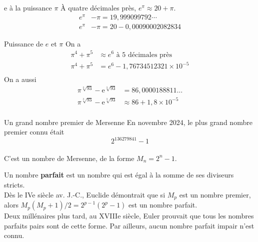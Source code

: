 \documentclass[aspectratio=1610,10pt,dvipsnames]{beamer}
\begin{document}
\begin{frame}{e à la puissance $\pi$}
À quatre décimales près, $e^\pi \approx 20 + \pi$.
\\[2cm]
\begin{equation*}
\begin{split}
    e^{\pi} &- \pi = 19,999099792\cdots \\
    e^{\pi} &- \pi = 20 - 0,00090002082834
\end{split}
\end{equation*}

\end{frame}

\begin{frame}{Puissance de $e$ et $\pi$}
On a 
\begin{equation*}
\begin{split}
    \pi^4 + \pi^5 &\approx e^6 \textrm{ à 5 décimales près} \\
    \pi^4 + \pi^5 &= e^6 - 1,76734512321 \times 10^{-5} \\
\end{split}
\end{equation*}
On a aussi
\begin{equation*}
\begin{split}
    \pi ^{\sqrt[{3}]{93}}-\mathrm {e} ^{\sqrt[{3}]{93}} &= 86{,}0000188811\dots \\
     \pi ^{\sqrt[{3}]{93}}-\mathrm {e} ^{\sqrt[{3}]{93}} &\approx 86 + 1,8 \times 10^{-5} \\
\end{split} 
\end{equation*}
\end{frame}

\begin{frame}{Un grand nombre premier de Mersenne}
En novembre 2024, le plus grand nombre premier connu était 
\\[1cm]
\begin{equation*}
    2^{136279841} - 1    
\end{equation*}
\\[1cm]
C'est un nombre de Mersenne, de la forme $M_n = 2^n - 1$.

Un nombre \textbf{parfait} est un nombre qui est égal à la somme de ses diviseurs stricts. 
\\[0.5em]
Dès le IVe siècle av. J.-C., Euclide démontrait que si $M_p$ est un nombre premier, alors 
$M_{p}(M_{p} + 1)/2 = 2^{p-1}(2^{p}-1)$ est un nombre parfait. 
\\[0.5em]
Deux millénaires plus tard, au XVIIIe siècle, Euler prouvait que tous les nombres parfaits pairs sont de 
cette forme. Par ailleurs, aucun nombre parfait impair n'est connu.
\end{frame}
\end{document}
